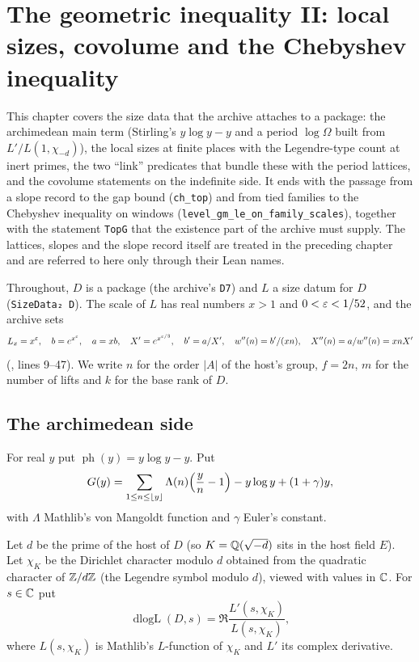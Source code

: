 \chapter{The geometric inequality II: local sizes, covolume and the Chebyshev inequality}\label{ch:geob}

This chapter covers the size data that the archive attaches to a package: the
archimedean main term (Stirling's $y\log y-y$ and a period $\log\Omega$ built
from $L'/L(1,\chi_{-d})$), the local sizes at finite places with the
Legendre-type count at inert primes, the two ``link'' predicates that bundle
these with the period lattices, and the covolume statements on the indefinite
side. It ends with the passage from a slope record to the gap bound
(\texttt{ch\_top}) and from tied families to the Chebyshev inequality on
windows (\texttt{level\_gm\_le\_on\_family\_scales}), together with the
statement \texttt{TopG} that the existence part of the archive must supply.
The lattices, slopes and the slope record itself are treated in the preceding
chapter and are referred to here only through their Lean names.

Throughout, $D$ is a package (the archive's \texttt{D7}) and $L$ a size datum
for $D$ (\texttt{SizeData₂ D}). The scale of $L$ has real numbers $x>1$ and
$0<\varepsilon<1/52$, and the archive sets
\[
L_x=x^{\varepsilon},\quad b=e^{x^{\varepsilon}},\quad a=xb,\quad X'=e^{x^{\varepsilon/3}},\quad
b'=a/X',\quad w''(n)=b'/(xn),\quad X''(n)=a/w''(n)=xnX'
\]
(, lines 9--47).
We write $n$ for the order $|A|$ of the host's group, $f=2n$, $m$ for the
number of lifts and $k$ for the base rank of $D$.

\section{The archimedean side}

\begin{definition}\label{geob:phF}
For real $y$ put $\operatorname{ph}(y)=y\log y-y$. Put
\[
G(y)=\sum_{1\le n\le\lfloor y\rfloor}\Lambda(n)\Bigl(\frac yn-1\Bigr)-y\log y+(1+\gamma)y,
\]
with $\Lambda$ Mathlib's von Mangoldt function and $\gamma$ Euler's constant.
\end{definition}

\begin{definition}\label{geob:dlogL}
Let $d$ be the prime of the host of $D$ (so $K=\mathbb{Q}(\sqrt{-d})$ sits in the host
field $E$). Let $\chi_K$ be the Dirichlet character modulo $d$ obtained from
the quadratic character of $\mathbb{Z}/d\mathbb{Z}$ (the Legendre symbol modulo $d$), viewed
with values in $\mathbb{C}$. For $s\in\mathbb{C}$ put
\[
\operatorname{dlogL}(D,s)=\Re\frac{L'(s,\chi_K)}{L(s,\chi_K)},
\]
where $L(s,\chi_K)$ is Mathlib's $L$-function of $\chi_K$ and $L'$ its complex
derivative.
\end{definition}

